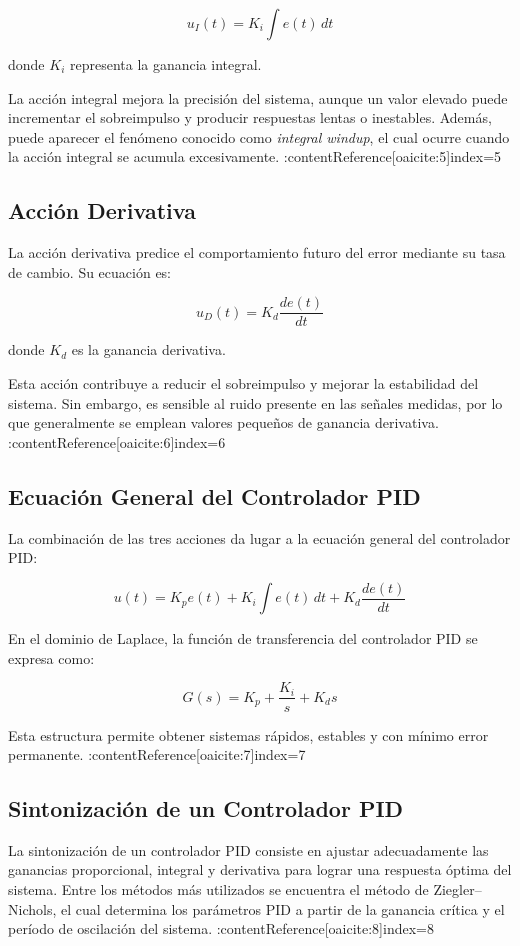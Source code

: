 \documentclass[journal, onecolumn]{IEEEtran}
\begin{document}
\[
u_I(t)=K_i \int e(t)\,dt
\]

donde $K_i$ representa la ganancia integral.

La acción integral mejora la precisión del sistema, aunque un valor elevado puede incrementar el sobreimpulso y producir respuestas lentas o inestables. Además, puede aparecer el fenómeno conocido como \textit{integral windup}, el cual ocurre cuando la acción integral se acumula excesivamente. :contentReference[oaicite:5]{index=5}

\subsection{Acción Derivativa}

La acción derivativa predice el comportamiento futuro del error mediante su tasa de cambio. Su ecuación es:

\[
u_D(t)=K_d \frac{de(t)}{dt}
\]

donde $K_d$ es la ganancia derivativa.

Esta acción contribuye a reducir el sobreimpulso y mejorar la estabilidad del sistema. Sin embargo, es sensible al ruido presente en las señales medidas, por lo que generalmente se emplean valores pequeños de ganancia derivativa. :contentReference[oaicite:6]{index=6}

\subsection{Ecuación General del Controlador PID}

La combinación de las tres acciones da lugar a la ecuación general del controlador PID:

\[
u(t)=K_p e(t)+K_i \int e(t)\,dt+K_d \frac{de(t)}{dt}
\]

En el dominio de Laplace, la función de transferencia del controlador PID se expresa como:

\[
G(s)=K_p+\frac{K_i}{s}+K_d s
\]

Esta estructura permite obtener sistemas rápidos, estables y con mínimo error permanente. :contentReference[oaicite:7]{index=7}

\subsection{Sintonización de un Controlador PID}

La sintonización de un controlador PID consiste en ajustar adecuadamente las ganancias proporcional, integral y derivativa para lograr una respuesta óptima del sistema. Entre los métodos más utilizados se encuentra el método de Ziegler–Nichols, el cual determina los parámetros PID a partir de la ganancia crítica y el período de oscilación del sistema. :contentReference[oaicite:8]{index=8}
\end{document}
